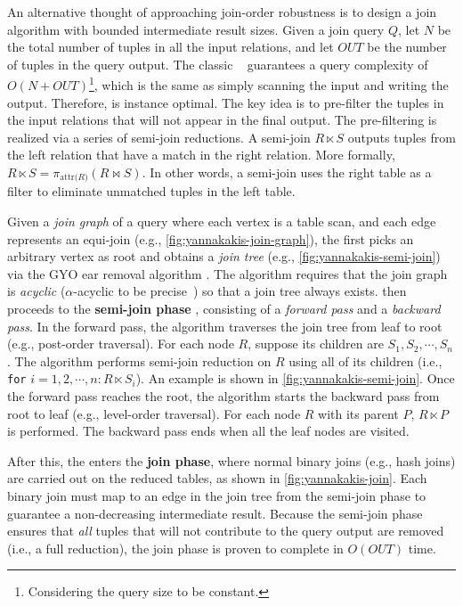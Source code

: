 An alternative thought of approaching join-order robustness is to design a join algorithm with bounded intermediate result sizes. Given a join query $Q$, let $N$ be the total number of tuples in all the input relations, and let $OUT$ be the number of tuples in the query output. The classic \textbf{\YannAlg}~\cite{yannakakis1981YA} guarantees a query complexity of $O(N + OUT)$\footnote{Considering the query size to be constant.}, which is the same as simply scanning the input and writing the output. Therefore, \YannAlg is instance optimal. The key idea is to pre-filter the tuples in the input relations that will not appear in the final output. The pre-filtering is realized via a series of semi-join reductions. A semi-join  $R \ensuremath{\ltimes} S$ outputs tuples from the left relation that have a match in the right relation. More formally, $R \ensuremath{\ltimes} S = \pi_{\text{attr(}R\text{)}}(R \bowtie S)$. In other words, a semi-join uses the right table as a filter to eliminate unmatched tuples in the left table.

Given a \emph{join graph} of a query where each vertex is a table scan, and each edge represents an equi-join (e.g., \cref{fig:yannakakis-join-graph}), the \YannAlg first picks an arbitrary vertex as root and obtains a \emph{join tree} (e.g., \cref{fig:yannakakis-semi-join}) via the GYO ear removal algorithm \cite{gyo}. The algorithm requires that the join graph is \emph{acyclic}  ($\alpha$-acyclic to be precise~\cite{yannakakis1981YA}) so that a join tree always exists. \YannAlg then proceeds to the \textbf{semi-join phase} \cite{usingsemi}, consisting of a \emph{forward pass} and a \emph{backward pass}. In the forward pass, the algorithm traverses the join tree from leaf to root (e.g., post-order traversal). For each node $R$, suppose its children are $S_1, S_2, \cdots, S_n$. The algorithm performs semi-join reduction on $R$ using all of its children (i.e., \texttt{for} $i = 1, 2, \cdots, n: R \ensuremath{\ltimes} S_i$). An example is shown in \cref{fig:yannakakis-semi-join}. Once the forward pass reaches the root, the algorithm starts the backward pass from root to leaf (e.g., level-order traversal). For each node $R$ with its parent $P$, $R \ensuremath{\ltimes} P$ is performed. The backward pass ends when all the leaf nodes are visited.

After this, the \YannAlg enters the \textbf{join phase}, where normal binary joins (e.g., hash joins) are carried out on the reduced tables, as shown in \cref{fig:yannakakis-join}. Each binary join must map to an edge in the join tree from the semi-join phase to guarantee a non-decreasing intermediate result. Because the semi-join phase ensures that \emph{all} tuples that will not contribute to the query output are removed (i.e., a full reduction), the join phase is proven to complete in $O(OUT)$ time.

